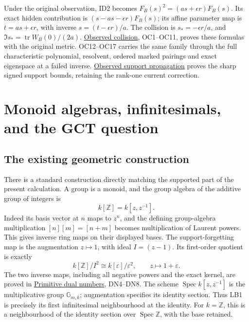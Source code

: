 \documentclass[
]{article}
\begin{document}
Under the original observation, ID2 becomes
\(F_B(s)^2=(as+\epsilon r)F_B(s)\). Its exact hidden contribution is
\((s-as-\epsilon r)F_B(s)\); its affine parameter map is
\(t=as+\epsilon r\), with inverse \(s=(t-\epsilon r)/a\). The collision
is \(s_*=-\epsilon r/a\), and \(\Im s_*=\operatorname{tr}W_B(0)/(2a)\).
\href{https://github.com/KokunoYumeto/zeta-function-research-reader/blob/c9df443d9e1df000dfbb083943f97197e746eb08/workbenches/splitzero-tandem/branches/identity-absorber-square/OBSERVED_COLLISION.md}{Observed
collision}, OC1--OC11, proves these formulas with the original metric.
OC12--OC17 carries the same family through the full characteristic
polynomial, resolvent, ordered marked pairings and exact eigenspace at a
failed inverse.
\href{https://github.com/KokunoYumeto/zeta-function-research-reader/blob/c9df443d9e1df000dfbb083943f97197e746eb08/workbenches/splitzero-tandem/branches/identity-absorber-square/OBSERVED_SUPPORT_PROPAGATION.md}{Observed
support propagation} proves the sharp signed support bounds, retaining
the rank-one current correction.

\section{Monoid algebras, infinitesimals, and the GCT
question}\label{monoid-algebras-infinitesimals-and-the-gct-question}

\subsection{The existing geometric
construction}\label{the-existing-geometric-construction}

There is a standard construction directly matching the supported part of
the present calculation. A group is a monoid, and the group algebra of
the additive group of integers is \[
k[\mathbb Z]=k[z,z^{-1}].
\] Indeed its basis vector at \(n\) maps to \(z^n\), and the defining
group-algebra multiplication \([n][m]=[n+m]\) becomes multiplication of
Laurent powers. This gives inverse ring maps on their displayed bases.
The support-forgetting map is the augmentation \(z\mapsto1\), with ideal
\(I=(z-1)\). Its first-order quotient is exactly \[
k[\mathbb Z]/I^2\cong k[\varepsilon]/\varepsilon^2,
\qquad z\mapsto1+\varepsilon.
\tag{LB1}
\] The two inverse maps, including all negative powers and the exact
kernel, are proved in
\href{https://github.com/KokunoYumeto/zeta-function-research-reader/blob/6af54ea3c8ef99127af327f3103e086c68d482c2/workbenches/splitzero-tandem/branches/identity-absorber-square/PRIMITIVE_DUAL_NUMBERS.md}{Primitive
dual numbers}, DN4--DN8. The scheme \(\operatorname{Spec}k[z,z^{-1}]\)
is the multiplicative group \(\mathbb G_{m,k}\); augmentation specifies
its identity section. Thus LB1 is precisely its first infinitesimal
neighbourhood at the identity. For \(k=\mathbb Z\), this is a
neighbourhood of the identity section over
\(\operatorname{Spec}\mathbb Z\), with the base retained.
\end{document}
